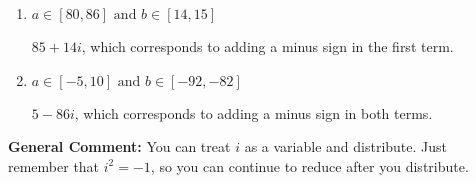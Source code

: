 \documentclass{extbook}[14pt]
\begin{document}
\begin{enumerate}
{\begin{enumerate}[label=\Alph*.]
 $45 + 40 i$, which corresponds to just multiplying the real terms to get the real part of the solution and the coefficients in the complex terms to get the complex part.
\item \( a \in [80, 86] \text{ and } b \in [14, 15] \)

 $85 + 14 i$, which corresponds to adding a minus sign in the first term.
\item \( a \in [-5, 10] \text{ and } b \in [-92, -82] \)

 $5 - 86 i$, which corresponds to adding a minus sign in both terms.
\end{enumerate}

\textbf{General Comment:} You can treat $i$ as a variable and distribute. Just remember that $i^2=-1$, so you can continue to reduce after you distribute.
}
\end{enumerate}
\end{document}
